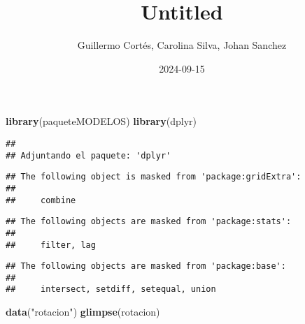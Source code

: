 \documentclass[
]{article}
\title{Untitled}
\author{Guillermo Cortés, Carolina Silva, Johan Sanchez}
\date{2024-09-15}
\newenvironment{Shaded}{\begin{snugshade}}{\end{snugshade}}
\newcommand{\FunctionTok}[1]{\textcolor[rgb]{0.13,0.29,0.53}{\textbf{#1}}}
\newcommand{\NormalTok}[1]{#1}
\newcommand{\StringTok}[1]{\textcolor[rgb]{0.31,0.60,0.02}{#1}}
\begin{document}
\maketitle

\begin{Shaded}
\begin{Highlighting}[]
\FunctionTok{library}\NormalTok{(paqueteMODELOS)}
\FunctionTok{library}\NormalTok{(dplyr)}
\end{Highlighting}
\end{Shaded}

\begin{verbatim}
## 
## Adjuntando el paquete: 'dplyr'
\end{verbatim}

\begin{verbatim}
## The following object is masked from 'package:gridExtra':
## 
##     combine
\end{verbatim}

\begin{verbatim}
## The following objects are masked from 'package:stats':
## 
##     filter, lag
\end{verbatim}

\begin{verbatim}
## The following objects are masked from 'package:base':
## 
##     intersect, setdiff, setequal, union
\end{verbatim}

\begin{Shaded}
\begin{Highlighting}[]
\FunctionTok{data}\NormalTok{(}\StringTok{"rotacion"}\NormalTok{)}
\FunctionTok{glimpse}\NormalTok{(rotacion)}
\end{Highlighting}
\end{Shaded}
\end{document}
